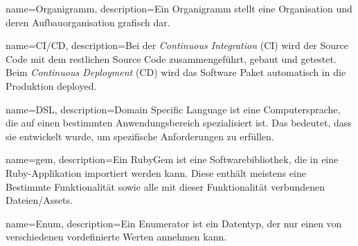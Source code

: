 {
  name={Organigramm},
  description={Ein Organigramm stellt eine Organisation und deren Aufbauorganisation grafisch dar.}
}

{
  name={CI/CD},
  description={Bei der \emph{Continuous Integration} (CI) wird der Source Code mit dem restlichen Source Code zusammengeführt, gebaut und getestet.
      Beim \emph{Continuous Deployment} (CD) wird das Software Paket automatisch in die Produktion deployed.}
}

{
  name={DSL},
  description={Domain Specific Language ist eine Computersprache, die auf einen bestimmten Anwendungsbereich spezialisiert ist. Das bedeutet, dass sie entwickelt wurde, um spezifische Anforderungen zu erfüllen.}
}

{
  name={gem},
  description={Ein RubyGem ist eine Softwarebibliothek, die in eine Ruby-Applikation importiert werden kann. Diese enthält meistens eine Bestimmte Funktionalität sowie alle mit dieser Funktionalität verbundenen Dateien/Assets.}
}

{
  name={Enum},
  description={Ein Enumerator ist ein Datentyp, der nur einen von verschiedenen vordefinierte Werten annehmen kann.}
}
